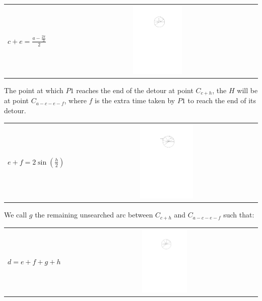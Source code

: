 \documentclass[11pt]{article}
\begin{document}
\begin{flushleft}
    \begin{tabularx}{\textwidth}{lXc}
        \multirow{2}{*}{$c+e = \frac{a - \frac{2\pi}{3}}{2}$} & &  \parbox[c]{0.25\textwidth}{\includegraphics[width=0.25\textwidth]{Q2S1_Eq/Q2S1_Old/eq_4.pdf}} \\
    \end{tabularx}

    The point at which $P1$ reaches the end of the detour at point $C_{c + h}$,
    the $H$ will be at point $C_{a - c - e - f}$, where $f$ is the extra time
    taken by $P1$ to reach the end of its detour.

    \begin{tabularx}{\textwidth}{lXc}
        \multirow{2}{*}{$e+f = 2\sin(\frac{h}{2})$} & & \parbox[c]{0.3\textwidth}{\includegraphics[width=0.3\textwidth]{Q2S1_Eq/Q2S1_Old/eq_5.pdf}} \\
    \end{tabularx}

    We call $g$ the remaining unsearched arc between $C_{c + h}$ and $C_{a - c - e - f}$
    such that:

    \begin{tabularx}{\textwidth}{lXc}
        \multirow{2}{*}{$d = e+f+g+h$} & & \parbox[c]{0.25\textwidth}{\includegraphics[width=0.25\textwidth]{Q2S1_Eq/Q2S1_Old/eq_3.pdf}} \\
    \end{tabularx}


\end{flushleft}
\end{document}
